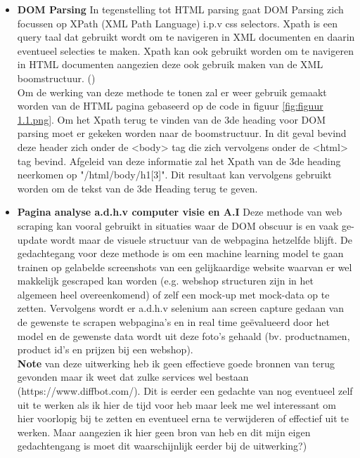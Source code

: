 \begin{itemize}
    \item \textbf{DOM Parsing}
In tegenstelling tot HTML parsing gaat DOM Parsing zich focussen op XPath (XML Path Language)  i.p.v css selectors. Xpath is een query taal dat gebruikt wordt om te navigeren in XML documenten en daarin eventueel selecties te maken. Xpath kan ook gebruikt worden om te navigeren in HTML documenten aangezien deze ook gebruik maken van de XML boomstructuur. (\cite{Persson2019,Mitchell2018})
\\
Om de werking van deze methode te tonen zal er weer gebruik gemaakt worden van de HTML pagina gebaseerd op de code in figuur \ref{fig:figuur 1.1.png}. Om het Xpath terug te vinden van de  3de heading voor DOM parsing moet er  gekeken worden naar de boomstructuur. In dit geval bevind deze header zich onder de <body> tag die zich vervolgens onder de <html> tag bevind. Afgeleid van deze informatie zal het Xpath van de 3de heading neerkomen op 
"/html/body/h1[3]". Dit resultaat kan vervolgens gebruikt worden om de tekst van de 3de Heading terug te geven.
    \item \textbf{Pagina analyse a.d.h.v computer visie en A.I}
Deze methode van web scraping kan vooral gebruikt in situaties waar de DOM obscuur is en vaak ge-update wordt maar de visuele structuur van de webpagina hetzelfde blijft. De gedachtegang voor deze methode is om een machine learning model te gaan trainen op gelabelde screenshots van een gelijkaardige website waarvan er wel makkelijk gescraped kan worden (e.g. webshop structuren zijn in het algemeen heel overeenkomend) of zelf een mock-up met mock-data op te zetten. Vervolgens wordt er a.d.h.v selenium aan screen capture gedaan van de gewenste te scrapen webpagina's en in real time geëvalueerd door het model en de gewenste data wordt uit deze foto's gehaald (bv. productnamen, product id's en prijzen bij een webshop). 
\\
\textbf{Note }van deze uitwerking heb ik geen effectieve goede bronnen van terug gevonden maar ik weet dat zulke services wel bestaan (https://www.diffbot.com/). Dit is eerder een gedachte van nog eventueel zelf uit te werken als ik hier de tijd voor heb maar leek me wel interessant om hier voorlopig bij te zetten en eventueel erna te verwijderen of effectief uit te werken. Maar aangezien ik hier geen bron van heb en dit mijn eigen gedachtengang is moet dit waarschijnlijk eerder bij de uitwerking?)
\end{itemize}

